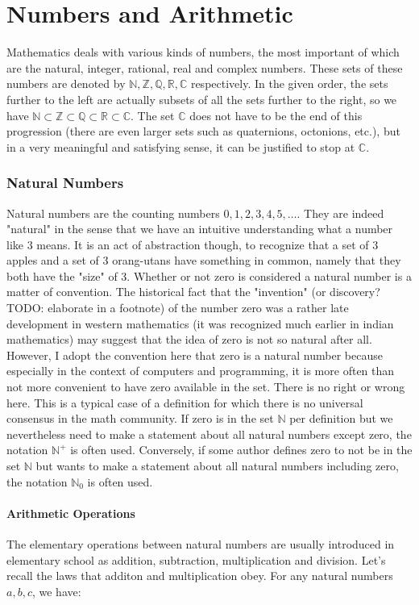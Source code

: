 \section{Numbers and Arithmetic} 

Mathematics deals with various kinds of numbers, the most important of which are the natural, integer, rational, real and complex numbers. These sets of these numbers are denoted by  $\mathbb{N,Z,Q,R,C}$ respectively. In the given order, the sets further to the left are actually subsets of all the sets further to the right, so we have $\mathbb{N \subset Z \subset Q \subset R \subset C}$. The set $\mathbb{C}$ does not have to be the end of this progression (there are even larger sets such as quaternions, octonions, etc.), but in a very meaningful and satisfying sense, it can be justified to stop at $\mathbb{C}$.

\subsubsection{Natural Numbers}
Natural numbers are the counting numbers $0,1,2,3,4,5,\ldots$. They are indeed "natural" in the sense that we have an intuitive understanding what a number like $3$ means. It is an act of abstraction though, to recognize that a set of 3 apples and a set of 3 orang-utans have something in common, namely that they both have the "size" of 3. Whether or not zero is considered a natural number is a matter of convention. The historical fact that the "invention" (or discovery? TODO: elaborate in a footnote) of the number zero was a rather late development in western mathematics (it was recognized much earlier in indian mathematics) may suggest that the idea of zero is not so natural after all. However, I adopt the convention here that zero is a natural number because especially in the context of computers and programming, it is more often than not more convenient to have zero available in the set. There is no right or wrong here. This is a typical case of a definition for which there is no universal consensus in the math community. If zero is in the set $\mathbb{N}$ per definition but we nevertheless need to make a statement about all natural numbers except zero, the notation $\mathbb{N}^+$ is often used. Conversely, if some author defines zero to not be in the set $\mathbb{N}$ but wants to make a statement about all natural numbers including zero, the notation $\mathbb{N}_0$ is often used.

\paragraph{Arithmetic Operations}
The elementary operations between natural numbers are usually introduced in elementary school as addition, subtraction, multiplication and division. Let's recall the laws that additon and multiplication obey. For any natural numbers $a,b,c$, we have:

